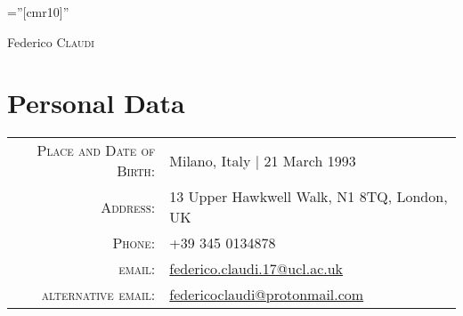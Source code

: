 \documentclass[a4paper,10pt]{article}
\begin{document}

\pagestyle{empty} %

\font\fb=''[cmr10]'' %

\par{\centering
		{\Huge Federico\textsc{ Claudi}
	}\bigskip\par}

\section{Personal Data}

\begin{tabular}{rl}
    \textsc{Place and Date of Birth:} & Milano, Italy  | 21 March 1993 \\
    \textsc{Address:}   & 13 Upper Hawkwell Walk, N1 8TQ, London, UK \\
    \textsc{Phone:}     & +39 345 0134878\\
    \textsc{email:}     & \href{mailto:federico.claudi.17@ucl.ac.uk}{federico.claudi.17@ucl.ac.uk} \\
    \textsc{alternative email:}     & \href{mailto:federicoclaudo@protonmail.com}{federicoclaudi@protonmail.com} \\
\end{tabular}
\\

\end{document}
